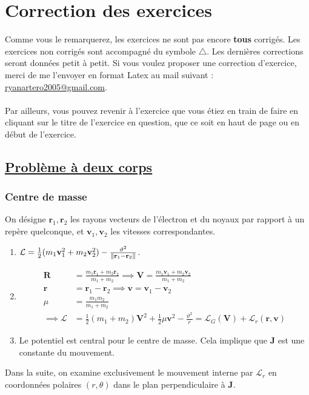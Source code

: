 \documentclass[a4paper,10pt]{report}
\begin{document}
	\chapter{Correction des exercices}\label{section:correction}
	Comme vous le remarquerez, les exercices ne sont pas encore \textbf{tous} corrigés. 
	Les exercices non corrigés sont accompagné du symbole $\triangle$. Les dernières corrections seront données petit à petit. Si vous voulez proposer une correction d'exercice, merci de me l'envoyer en format Latex au mail suivant :
\\ \href{mailto:ryanartero2005@gmail.com}{ryanartero2005@gmail.com}.\\\\
Par ailleurs, vous pouvez revenir à l'exercice que vous étiez en train de faire en cliquant sur le titre de l'exercice en question, que ce soit en haut de page ou en début de l'exercice.

 \section{\hyperref[subsec:2corps]{Problème à deux corps}}\label{subsec:correction2corps}

\subsection{Centre de masse}
On désigne $\textbf{r}_1, \textbf{r}_2$ les rayons vecteurs de l'électron et du noyaux par rapport à un repère quelconque, et $\textbf{v}_1, \textbf{v}_2$ les vitesses correspondantes. 
\begin{enumerate}
	\item $\mathcal L = \frac 1 2 (m_1 \textbf{v}_1^2+m_2\textbf{v}_2^2)-\frac{\vartheta^2}{\norm{\textbf{r}_1-\textbf{r}_2}}$.
	\item \begin{align*}
	\textbf{R} &= \frac{m_1\textbf{r}_1+m_2\textbf{r}_2}{m_1+m_2} \implies \textbf{V} = \frac{m_1\textbf{v}_1+m_2\textbf{v}_2}{m_1+m_2} \\
	\textbf{r}&= \textbf{r}_1-\textbf{r}_2 \implies \textbf{v} =  \textbf{v}_1-\textbf{v}_2\\
	\mu &= \frac {m_1m_2}{m_1+m_2}\\
	\implies \mathcal L &= \frac 1 2 (m_1+m_2)\textbf{V}^2+\frac 1 2 \mu \textbf{v}^2-\frac {\vartheta^2}r = \mathcal L_G(\textbf{V})+\mathcal L_r(\textbf{r},\textbf{v})
	\end{align*}
	\item Le potentiel est central pour le centre de masse. Cela implique que $\textbf{J}$ est une constante du mouvement.
\end{enumerate}
Dans la suite, on examine exclusivement le mouvement interne par $\mathcal{L}_r$ en coordonnées polaires $(r, \theta)$ dans le plan perpendiculaire à $\textbf{J}$.
\end{document}
